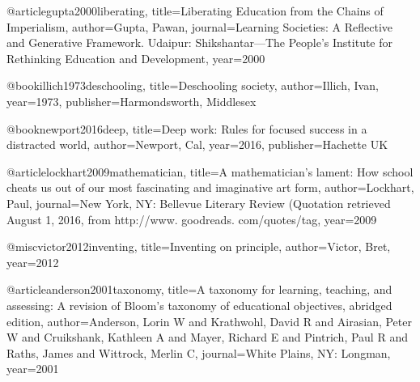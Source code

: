 @article{gupta2000liberating,
  title={Liberating Education from the Chains of Imperialism},
  author={Gupta, Pawan},
  journal={Learning Societies: A Reflective and Generative Framework. Udaipur: Shikshantar—The People's Institute for Rethinking Education and Development},
  year={2000}
}

@book{illich1973deschooling,
  title={Deschooling society},
  author={Illich, Ivan},
  year={1973},
  publisher={Harmondsworth, Middlesex}
}


@book{newport2016deep,
  title={Deep work: Rules for focused success in a distracted world},
  author={Newport, Cal},
  year={2016},
  publisher={Hachette UK}
}

@article{lockhart2009mathematician,
  title={A mathematician’s lament: How school cheats us out of our most fascinating and imaginative art form},
  author={Lockhart, Paul},
  journal={New York, NY: Bellevue Literary Review (Quotation retrieved August 1, 2016, from http://www. goodreads. com/quotes/tag},
  year={2009}
}

@misc{victor2012inventing,
  title={Inventing on principle},
  author={Victor, Bret},
  year={2012}
}

@article{anderson2001taxonomy,
  title={A taxonomy for learning, teaching, and assessing: A revision of Bloom’s taxonomy of educational objectives, abridged edition},
  author={Anderson, Lorin W and Krathwohl, David R and Airasian, Peter W and Cruikshank, Kathleen A and Mayer, Richard E and Pintrich, Paul R and Raths, James and Wittrock, Merlin C},
  journal={White Plains, NY: Longman},
  year={2001}
}
